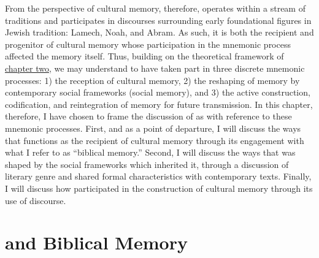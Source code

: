 From the perspective of cultural memory, therefore, \ga operates within a stream of traditions and participates in discourses surrounding early foundational figures in Jewish tradition: Lamech, Noah, and Abram. As such, it is both the recipient and progenitor of cultural memory whose participation in the mnemonic process affected the memory itself. Thus, building on the theoretical framework of \hyperref[chap:memory]{chapter two}, we may understand \ga to have taken part in three discrete mnemonic processes: 1) the reception of cultural memory, 2) the reshaping of memory by contemporary social frameworks (social memory), and 3) the active construction, codification, and reintegration of memory for future transmission. In this chapter, therefore, I have chosen to frame the discussion of \ga as \rwb with reference to these mnemonic processes. First, and as a point of departure, I will discuss the ways that \ga functions as the recipient of cultural memory through its engagement with what I refer to as  ``biblical memory.'' Second, I will discuss the ways that \ga was shaped by the social frameworks which inherited it, through a discussion of literary genre and shared formal characteristics with contemporary texts. Finally, I will discuss how \ga participated in the construction of cultural memory through its use of \psgraphical discourse.


\section{\ga and Biblical Memory}

